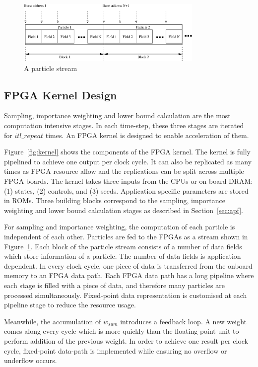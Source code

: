 \begin{figure}[t!]
\centering
\includegraphics[width=0.8\textwidth]{runtime_reconfiguration/figures/fig_particles}
\caption{A particle stream}
\label{fig:particles_stream}
\end{figure}

\subsection{FPGA Kernel Design}
Sampling, importance weighting and lower bound calculation are the most computation intensive stages.
In each time-step, these three stages are iterated for $itl\_repeat$ times.
An FPGA kernel is designed to enable acceleration of them.

Figure~\ref{fig:kernel} shows the components of the FPGA kernel.
The kernel is fully pipelined to achieve one output per clock cycle.
It can also be replicated as many times as FPGA resource allow and the replications can be split across multiple FPGA boards.
The kernel takes three inputs from the CPUs or on-board DRAM: (1) states, (2) controls, and (3) seeds.
Application specific parameters are stored in ROMs.
Three building blocks correspond to the sampling, importance weighting and lower bound calculation stages as described in Section~\ref{sec:apf}.

For sampling and importance weighting, the computation of each particle is independent of each other.
Particles are fed to the FPGAs as a stream shown in Figure~\ref{fig:particles_stream}.
Each block of the particle stream consists of a number of data fields which store information of a particle.
The number of data fields is application dependent.
In every clock cycle, one piece of data is transferred from the onboard memory to an FPGA data path.
Each FPGA data path has a long pipeline where each stage is filled with a piece of data, and therefore many particles are processed simultaneously.
Fixed-point data representation is customised at each pipeline stage to reduce the resource usage.

Meanwhile, the accumulation of $w_{sum}$ introduces a feedback loop.
A new weight comes along every cycle which is more quickly than the floating-point unit to perform addition of the previous weight.
In order to achieve one result per clock cycle, fixed-point data-path is implemented while ensuring no overflow or underflow occurs.

